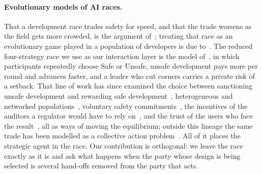 \documentclass[11pt,a4paper]{article}
\theoremstyle{definition}
\begin{document}
\paragraph{Evolutionary models of AI races.}
That a development race trades safety for speed, and that the trade worsens as
the field gets more crowded, is the argument of~\citet{armstrong2016racing};
treating that race as an evolutionary game played in a population of developers
is due to~\citet{han2020regulate}. The reduced four-strategy race we use as
our interaction layer is the model of~\citet{domingos2026falling}, in which
participants repeatedly choose Safe or Unsafe, unsafe development pays more per
round and advances faster, and a leader who cut corners carries a private risk
of a setback. That line of work has since examined the choice between sanctioning unsafe
development and rewarding safe development~\citep{han2021mediating},
heterogeneous and networked
populations~\citep{cimpeanu2022heterogeneous}, voluntary safety
commitments~\citep{han2022voluntary}, the incentives of the auditors a
regulator would have to rely on~\citep{bova2024vigilant}, and the trust of the
users who face the result~\citep{bashir2026trust,alalawi2026trust}, all as ways
of moving the equilibrium; outside this lineage the same trade has been
modelled as a collective action problem~\citep{lacroix2022tragedy}. All of it places the strategic agent in the race. Our contribution is orthogonal: we leave the race exactly as it is and
ask what happens when the party whose design is being selected is several
hand-offs removed from the party that acts.
\end{document}
